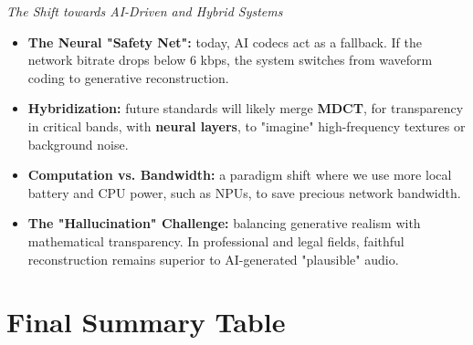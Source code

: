 \textit{The Shift towards AI-Driven and Hybrid Systems}

\begin{itemize}
\item \textbf{The Neural "Safety Net":} today, AI codecs act as a fallback. If the network bitrate drops below 6 kbps, the system switches from waveform coding to generative reconstruction.
\item \textbf{Hybridization:} future standards will likely merge \textbf{MDCT}, for transparency in critical bands, with \textbf{neural layers}, to "imagine" high-frequency textures or background noise.
\item \textbf{Computation vs. Bandwidth:} a paradigm shift where we use more local battery and CPU power, such as NPUs, to save precious network bandwidth.
\item \textbf{The "Hallucination" Challenge:} balancing generative realism with mathematical transparency. In professional and legal fields, faithful reconstruction remains superior to AI-generated "plausible" audio.
\end{itemize}

\section{Final Summary Table}

